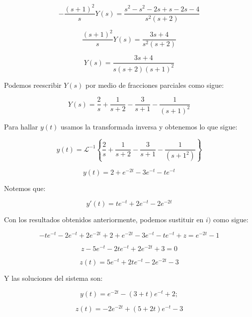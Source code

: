 \begin{equation*}
    - \frac{(s+1)^2}{s}Y(s)= \frac{s^2-s^2-2s+s-2s-4}{s^2(s+2)}
\end{equation*}

\begin{equation*}
    \frac{(s+1)^2}{s} Y(s)= \frac{3s+4}{s^2(s+2)}
\end{equation*}

\begin{equation*}
    Y(s)= \frac{3s+4}{s(s+2)(s+1)^2}
\end{equation*}

Podemos reescribir $Y(s)$ por medio de fracciones parciales como sigue: 

\begin{equation*}
    Y(s)= \frac{2}{s}+ \frac{1}{s+2}- \frac{3}{s+1}- \frac{1}{(s+1)^2}
\end{equation*}

Para hallar $y(t)$ usamos la transformada inversa y obtenemos lo que sigue: 

\begin{equation*}
    y(t)= {\mathcal{L}}^{-1} \left\lbrace \frac{2}{s}+ \frac{1}{s+2}- \frac{3}{s+1}- \frac{1}{(s+1^2)} \right\rbrace
\end{equation*}

\begin{equation*}
    y(t)=2+ e^{-2t}- 3e^{-t}- te^{-t}
\end{equation*}

Notemos que: 

\begin{equation*}
    y'(t)= te^{-t}+ 2e^{-t}-2e^{-2t}
\end{equation*}

Con los resultados obtenidos anteriormente, podemos sustituir en $i)$ como sigue: 

\begin{equation*}
    -te^{-t}-2e^{-t}+2e^{-2t}+2+e^{-2t}-3e^{-t}-te^{-t}+z=e^{-2t}-1
\end{equation*}

\begin{equation*}
    z-5e^{-t}-2te^{-t}+2e^{-2t}+3=0
\end{equation*}
    
\begin{equation*}
   z(t)= 5e^{-t}+2te^{-t}-2e^{-2t}-3 
\end{equation*}    

Y las soluciones del sistema son:

\begin{equation*}
    y(t)=e^{-2t}-(3+t)e^{-t}+2;
\end{equation*}

\begin{equation*}
     z(t)=-2e^{-2t}+(5+2t)e^{-t}-3 
\end{equation*}
   